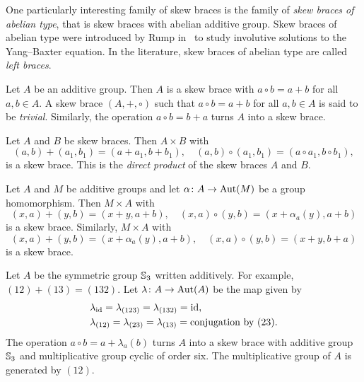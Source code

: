 One particularly interesting family of skew braces is the family of \emph{skew braces of abelian type}, 
that is skew braces with abelian additive group. 
Skew braces of abelian type were introduced by Rump in~\cite{MR2278047} to study involutive solutions to the Yang--Baxter equation. 
In the literature, skew braces of abelian type are called \emph{left braces}. 

\begin{example}
	\label{exa:trivial}
	Let $A$ be an additive group. Then $A$ is a skew brace with
	$a\circ b=a+b$ for all $a,b\in A$. 
	A skew brace $(A,+,\circ)$ such that $a\circ b=a+b$ for all $a,b\in A$ is
    said to be \emph{trivial}. 
	Similarly, the
   operation $a\circ b=b+a$ turns $A$ into a skew brace. 
\end{example}

\begin{example}
	\label{exa:times}
	Let $A$ and $B$ be skew braces. Then $A\times B$ with 
	\[
		(a,b)+(a_1,b_1)=(a+a_1,b+b_1),\quad
		(a,b)\circ (a_1,b_1)=(a\circ a_1,b\circ b_1),
	\]
	is a skew brace. This is the {\em direct product} of the skew braces $A$ and $B$. 
\end{example}

\begin{example}
	\label{exa:sd}
	Let $A$ and $M$ be additive groups and let $\alpha\colon A\to\operatorname{Aut}(M)$ be a
	group homomorphism. Then $M\times A$ with 
	\[
	(x,a)+(y,b)=(x+y,a+b),
	\quad
	(x,a)\circ (y,b)=(x+\alpha_a(y),a+b)
	\]
	is a skew brace. Similarly, $M\times A$ with
	\[
	(x,a)+(y,b)=(x+\alpha_a(y),a+b),\quad
	(x,a)\circ (y,b)=(x+y,b+a)
	\]
	is a skew brace. 
\end{example}

\begin{example}
  \label{exa:s3c6}
Let $A$ be the symmetric
  group $\mathbb{S}_3$ written additively. For example,
  $(12)+(13)=(132)$.
  Let $\lambda\colon A\to\operatorname{Aut}(A)$ 
  be the map given by
  \begin{align*}
    &\lambda_{\operatorname{id}}=\lambda_{(123)}=\lambda_{(132)}=\operatorname{id},\\
    &\lambda_{(12)}=\lambda_{(23)}=\lambda_{(13)}=\text{conjugation by $(23)$}.
  \end{align*}
  The operation $a\circ b=a+\lambda_a(b)$ 
  turns $A$ into a skew brace with
  additive group $\mathbb{S}_3$ and 
  multiplicative group cyclic of order six. The multiplicative
  group of $A$ is generated by $(12)$. 
\end{example}



